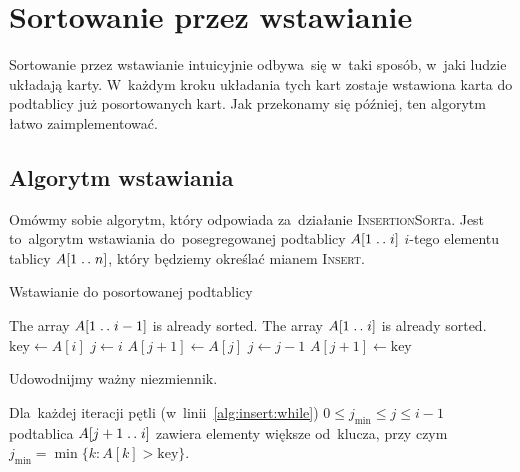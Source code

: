 \section{Sortowanie przez wstawianie}

Sortowanie przez wstawianie intuicyjnie odbywa~się w~taki sposób,
w~jaki ludzie układają karty. W~każdym kroku układania tych kart 
zostaje wstawiona karta do podtablicy już posortowanych kart.
Jak przekonamy się później, ten algorytm łatwo zaimplementować.

\subsection{Algorytm wstawiania}
Omówmy sobie algorytm, który odpowiada za~działanie 
\textsc{InsertionSort}a. Jest to~algorytm wstawiania 
do~posegregowanej podtablicy \( A[1 \mathrel{{.}\,{.}}\nobreak i] \) \(i\)-tego elementu
tablicy \(A[1 \mathrel{{.}\,{.}}\nobreak n]\), który będziemy określać
mianem \textsc{Insert}. 
\begin{algorithm}%
    \label{alg:insert}
    \caption{Wstawianie do posortowanej podtablicy}
    \begin{algorithmic}[1]
        \Require The array \( A[1 \mathrel{{.}\,{.}}\nobreak i - 1] \) is already sorted.
        \Ensure The array \( A[1 \mathrel{{.}\,{.}}\nobreak i] \) is already sorted.
            \State \( \text{key} \gets A[i]\)
            \State \( j \gets i \)
            \label{alg:insert:while}
                \State \( A[j + 1] \gets A[j] \)
                \State \( j \gets j - 1 \)
            \EndWhile
            \State \( A[j + 1] \gets \text{key} \)
        \EndProcedure%
    \end{algorithmic}
\end{algorithm}
Udowodnijmy ważny niezmiennik.
\begin{invariant}\label{inv:insert}
    Dla~każdej iteracji pętli (w~linii~\ref{alg:insert:while})
    \( 0 \le j_{\text{min}} \le j \le i - 1 \) podtablica \( A[ j + 1 \mathrel{{.}\,{.}}\nobreak i] \)
    zawiera elementy większe od~klucza,
    przy czym \( j_{\text{min}} = \min \{ k : A[k] > \text{key} \} \).
\end{invariant}
